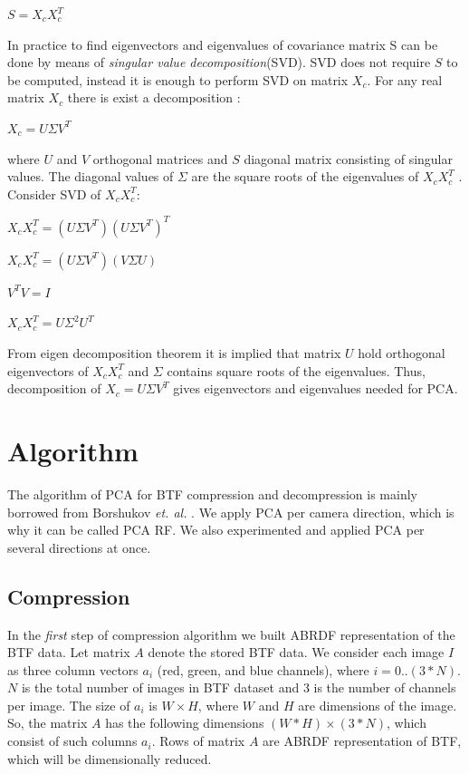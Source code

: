 {\centering$S=X_{c}X_{c}^T$\\}


In practice to find eigenvectors and eigenvalues of covariance matrix S can be done by means of \emph{singular value decomposition}(SVD).
SVD does not require $S$ to be computed, instead it is enough to perform SVD on matrix $X_{c}$.
For any real matrix $X_{c}$ there is exist a decomposition \cite{svd}:

{\centering $X_{c}=U\Sigma V^{T}$ \\}

where $U$ and $V$ orthogonal matrices and $S$ diagonal matrix consisting of singular values.
The diagonal values of $\Sigma$ are the square roots of the eigenvalues of $X_{c}X_{c}^T$ \cite{Lecture12A}.
Consider SVD of $X_{c}X_{c}^T$:

{\centering $X_{c}X_{c}^T=(U\Sigma V^{T})(U\Sigma V^{T})^T$ \\}

{\centering $X_{c}X_{c}^T=(U\Sigma V^{T})(V\Sigma U)$ \\}

{\centering $V^{T}V=I$ \\}

{\centering $X_{c}X_{c}^T=U\Sigma^2 U^{T}$ \\}

From eigen decomposition theorem \cite{eigendecompostion} it is implied that matrix $U$ hold orthogonal eigenvectors of $X_{c}X_{c}^T$
and $\Sigma$ contains square roots of the eigenvalues.
Thus, decomposition of $X_{c}=U\Sigma V^{T}$ gives eigenvectors and eigenvalues needed for PCA.
\section{Algorithm}
\label{section:algorithm_step}
The algorithm of PCA for BTF compression and decompression is mainly borrowed from  Borshukov  \emph{et. al.} \cite[Ch.\ 15]{gpu_gems}.
We apply PCA per camera direction, which is why it can be called PCA RF. 
We also experimented and applied PCA per several directions at once.

\subsection{Compression}
\label{section:compression}
In the \emph{first} step of compression algorithm we built ABRDF representation of the BTF data.
Let matrix $A$ denote the stored BTF data.
We consider each image $I$ as three column vectors $a_{i}$ (red, green, and blue channels), where $i=0..(3*N)$. $N$ is the total number of images in BTF dataset and 3 is the number of channels per image.
The size of $a_{i}$ is $W\times H$, where $W$ and $H$ are dimensions of the image.
So, the matrix $A$ has the following dimensions $(W*H)\times(3*N)$, which consist of such columns $a_{i}$.
Rows of matrix $A$ are ABRDF representation of BTF, which will be dimensionally reduced.

